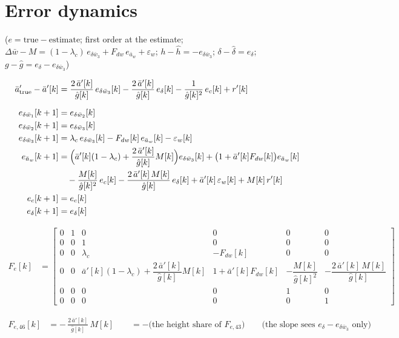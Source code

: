 \documentclass[11pt,a4paper,fontset=none]{ctexart}
\newcommand{\ba}{\bar{a}}
\newcommand{\bw}{\bar{w}}
\newcommand{\dW}{\Delta\bw}
\newcommand{\ap}{\ba'}
\newcommand{\hh}{\hat{h}}
\newcommand{\dl}{\delta}
\newcommand{\dlh}{\hat{\delta}}
\newcommand{\gs}{g}
\newcommand{\gh}{\hat{g}}
\begin{document}
\section{Error dynamics}

($e = \text{true} - \text{estimate}$; first order at the estimate; $\dW - M = (1-\lambda_c)\,e_{\delta\bw_3} + F_{dw}\,e_{\ba_w} + \varepsilon_w$;
$h - \hh = -e_{\delta\bw_3}$; $\dl - \dlh = e_{\dl}$; $\gs - \gh = e_{\dl} - e_{\delta\bw_3}$)

\begin{align*}
\ap_{\mathrm{true}} - \ap[k] &= \frac{2\,\ap[k]}{\gh[k]}\,e_{\delta\bw_3}[k] - \frac{2\,\ap[k]}{\gh[k]}\,e_{\dl}[k] - \frac{1}{\gh[k]^{2}}\,e_c[k] + r'[k] \\[6pt]
e_{\delta\bw_1}[k+1] &= e_{\delta\bw_2}[k] \\
e_{\delta\bw_2}[k+1] &= e_{\delta\bw_3}[k] \\
e_{\delta\bw_3}[k+1] &= \lambda_c\,e_{\delta\bw_3}[k] - F_{dw}[k]\,e_{\ba_w}[k] - \varepsilon_w[k] \\
e_{\ba_w}[k+1]       &= \Bigl(\ap[k](1-\lambda_c) + \frac{2\,\ap[k]}{\gh[k]}M[k]\Bigr)e_{\delta\bw_3}[k]
                        + \bigl(1 + \ap[k]F_{dw}[k]\bigr)e_{\ba_w}[k] \\
                     &\quad - \frac{M[k]}{\gh[k]^{2}}\,e_c[k]
                        - \frac{2\,\ap[k]\,M[k]}{\gh[k]}\,e_{\dl}[k]
                        + \ap[k]\,\varepsilon_w[k] + M[k]\,r'[k] \\
e_c[k+1]             &= e_c[k] \\
e_{\dl}[k+1]         &= e_{\dl}[k]
\end{align*}

\begin{align*}
F_e[k] &= \begin{bmatrix}
0 & 1 & 0 & 0 & 0 & 0 \\
0 & 0 & 1 & 0 & 0 & 0 \\
0 & 0 & \lambda_c & -F_{dw}[k] & 0 & 0 \\
0 & 0 & \ap[k](1-\lambda_c) + \dfrac{2\,\ap[k]}{\gh[k]}M[k] & 1 + \ap[k]F_{dw}[k] & -\dfrac{M[k]}{\gh[k]^{2}} & -\dfrac{2\,\ap[k]\,M[k]}{\gh[k]} \\
0 & 0 & 0 & 0 & 1 & 0 \\
0 & 0 & 0 & 0 & 0 & 1
\end{bmatrix}
\end{align*}

\begin{align*}
F_{e,46}[k] &= -\,\frac{2\,\ap[k]}{\gh[k]}\,M[k] \qquad = -\bigl(\text{the height share of } F_{e,43}\bigr)
\qquad\text{(the slope sees } e_{\dl} - e_{\delta\bw_3}\text{ only)}
\end{align*}
\end{document}
